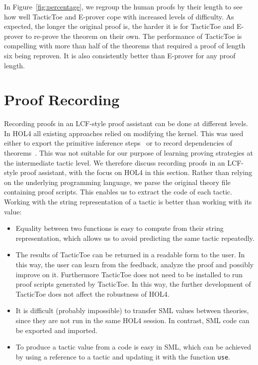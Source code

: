 \documentclass[runningheads,a4paper,draft]{svjour3}
\def\holfour{\textsf{HOL4}\xspace}
\def\eprover{\textsf{E-prover}\xspace}
\def\sml{\textsf{SML}\xspace}
\def\tactictoe{\textsf{TacticToe}\xspace}
\begin{document}
In Figure~\ref{fig:percentage}, we regroup the human proofs by their length to
see how well \tactictoe and \eprover cope with increased levels of
difficulty. As expected, the longer the original proof is, the harder it is
for \tactictoe and \eprover to re-prove the theorem on their own.
The performance of \tactictoe is compelling with more than half of the theorems
that required a proof of length six being reproven. It is also consistently
better than \eprover for any proof length.


\section{Proof Recording}\label{sec:recording}
Recording proofs in an LCF-style proof assistant can be done at different
levels.
In \holfour all existing approaches relied on modifying the kernel. This was
used
either to export the primitive inference
steps~\cite{Wong95recordingand,DBLP:conf/itp/KumarH12}
or to record dependencies of theorems~\cite{tgck-cpp15}. This was not suitable
for our
purpose of learning proving strategies at the intermediate tactic level. We
therefore
discuss recording proofs in an LCF-style proof assistant, with the focus on
\holfour
in this section.
%
Rather than relying on the underlying programming language, we parse the
original theory file containing proof scripts. This enables us to extract the
code of each tactic.
Working with the string representation of a tactic is better than working with
its value:
\begin{itemize}
\item Equality between two functions is easy to compute from
their string representation, which allows us to avoid
predicting the same tactic repeatedly.
\item
The
results of
\tactictoe can be returned in a readable form to the user. In this way, the
user can learn from the feedback, analyze the proof and possibly improve on it.
Furthermore \tactictoe does not need to be installed to run
proof scripts generated by \tactictoe. In this way, the further development of
\tactictoe does not affect the robustness of \holfour.
\item
It is difficult (probably impossible) to transfer \sml values
between theories, since they are not run in the same \holfour session. In contrast,
\sml code can be exported and imported.
\item To produce a tactic value from a code is easy in \sml, which can be
achieved by using a reference to a tactic and updating it with the function
\texttt{use}.
\end{itemize}
\end{document}
